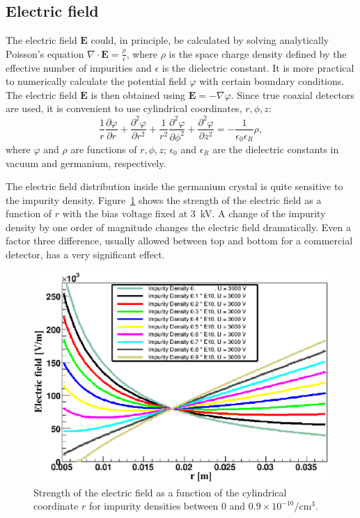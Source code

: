 \documentclass[epj]{svjour}
\begin{document}
\subsection{Electric field}
\label{s:field}
The electric field $\mathbf{E}$ could, in principle, be calculated by
solving analytically Poisson's equation $\nabla \cdot \mathbf{E} =
\frac{\rho}{\epsilon}$, where $\rho$ is the space charge density
defined by the effective number of impurities and $\epsilon$ is the
dielectric constant. It is more practical to numerically calculate the
potential field $\varphi$ with certain boundary conditions. The
electric field $\mathbf{E}$ is then obtained using $\mathbf{E} = -
\nabla \varphi$. Since true coaxial detectors are used, it is
convenient to use cylindrical coordinates, $r, \phi, z$:
\begin{equation} 
\frac{1}{r} \frac{\partial \varphi}{\partial r} + 
\frac{\partial^{2} \varphi}{\partial r^{2}} + 
\frac{1}{r^{2}} \frac{\partial^{2} \varphi}{\partial \phi^{2}} + 
\frac{\partial^{2} \varphi}{\partial z^{2}} = 
- \frac{1}{\epsilon_{0} \epsilon_{R}} \rho, 
\label{e:pocyl} 
\end{equation} 
where $\varphi$ and $\rho$ are functions of $r, \phi, z$;
$\epsilon_{0}$ and $\epsilon_{R}$ are the dielectric constants in
vacuum and germanium, respectively.
 
The electric field distribution inside the germanium crystal is quite
sensitive to the impurity density. Figure~\ref{f:rho} shows the
strength of the electric field as a function of $r$ with the bias
voltage fixed at 3~kV. A change of the impurity density by one order
of magnitude changes the electric field dramatically. Even a factor
three difference, usually allowed between top and bottom for a
commercial detector, has a very significant effect.
 
\begin{figure}[htbp]
\centering
\includegraphics[width=\linewidth]{rho} 
\caption{Strength of the electric field as a function of the
cylindrical coordinate $r$ for impurity densities between 0 and $0.9
\times 10^{-10}$/cm$^{3}$.}
\label{f:rho} 
\end{figure} 
\end{document}
